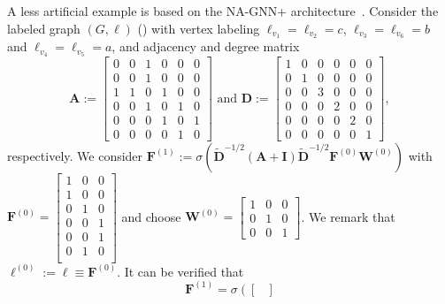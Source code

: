 \begin{example}\label{ex2}\normalfont
	A less artificial example is based on the NA-GNN+ architecture~\cite{kipf-loose}.
Consider the labeled graph $(G,\pmb{\ell})$ () with 
vertex labeling  $\pmb{\ell}_{v_1}=\pmb{\ell}_{v_2}=c$,
$\pmb{\ell}_{v_3}=\pmb{\ell}_{v_6}=b$ and $\pmb{\ell}_{v_4}=\pmb{\ell}_{v_5}=a$, and adjacency and degree matrix 
$$
\mathbf{A}:=\begin{bmatrix}
0 & 0 & 1 & 0 & 0 & 0\\
0 & 0 & 1 & 0 & 0 & 0\\
1 & 1 & 0 & 1 & 0 & 0\\
0 & 0 & 1 & 0 & 1 & 0\\
0 & 0 & 0 & 1 & 0 & 1\\
0 & 0 & 0 & 0 & 1 & 0
\end{bmatrix}\text{ and } 
\mathbf{D}:=
\begin{bmatrix}
1 & 0 & 0 & 0 & 0 & 0\\
0 & 1 & 0 & 0 & 0 & 0\\
0 & 0 & 3 & 0 & 0 & 0\\
0 & 0 & 0 & 2 & 0 & 0\\
0 & 0 & 0 & 0 & 2 & 0\\
0 & 0 & 0 & 0 & 0 & 1
\end{bmatrix},
$$
respectively. 
We consider $\mathbf{F}^{(1)}:=\sigma(\tilde{\mathbf{D}}^{-1/2}(\mathbf{A}+\mathbf{I})\tilde{\mathbf{D}}^{-1/2}\mathbf{F}^{(0)}\mathbf{W}^{(0)})$ with  $
\mathbf{F}^{(0)}=
\left[\begin{smallmatrix}
1 & 0 & 0\\
1 & 0 & 0\\
0 & 1 & 0\\
0 & 0 & 1\\
0 & 0 & 1\\
0 & 1 & 0\\
\end{smallmatrix}\right]
$ and choose $\mathbf{W}^{(0)}=\left[\begin{smallmatrix}
1 & 0 & 0\\
0 & 1 & 0\\
0 & 0 & 1
\end{smallmatrix}\right]$. 
We remark that $\pmb{\ell}^{(0)}:=\pmb{\ell}\equiv \mathbf{F}^{(0)}$.
It can be verified that
$$
\mathbf{F}^{(1)}=\sigma\left(\begin{bmatrix}

\end{bmatrix}$$
\end{example}
